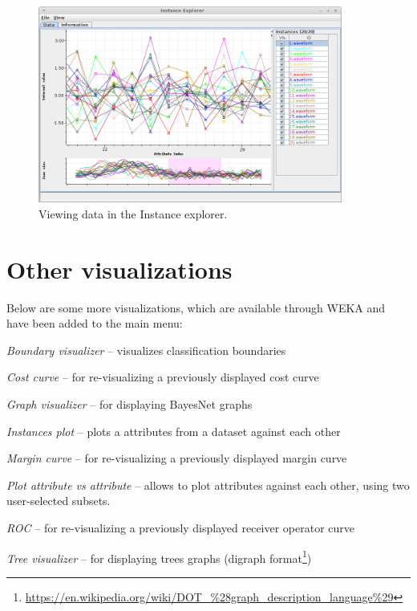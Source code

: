\begin{figure}[htb]
  \centering
  \includegraphics[width=10.0cm]{images/instance-explorer_view.png}
  \caption{Viewing data in the Instance explorer.}
  \label{instance-explorer_view}
\end{figure}

\clearpage
\section{Other visualizations}
Below are some more visualizations, which are available through WEKA and have
been added to the main menu:
\begin{tight_itemize}
  \item \textit{Boundary visualizer} -- visualizes classification boundaries
  \item \textit{Cost curve} -- for re-visualizing a previously displayed cost curve
  \item \textit{Graph visualizer} -- for displaying BayesNet graphs
  \item \textit{Instances plot} -- plots a attributes from a dataset against each other
  \item \textit{Margin curve} -- for re-visualizing a previously displayed margin curve
  \item \textit{Plot attribute vs attribute} -- allows to plot attributes against each other,
  using two user-selected subsets.
  \item \textit{ROC} -- for re-visualizing a previously displayed receiver operator curve
  \item \textit{Tree visualizer} -- for displaying trees graphs (digraph
  format\footnote{\url{https://en.wikipedia.org/wiki/DOT\_\%28graph\_description\_language\%29}{}})
\end{tight_itemize}